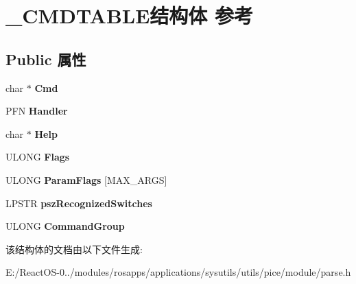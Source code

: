 \hypertarget{struct___c_m_d_t_a_b_l_e}{}\section{\+\_\+\+C\+M\+D\+T\+A\+B\+L\+E结构体 参考}
\label{struct___c_m_d_t_a_b_l_e}
\subsection*{Public 属性}
\begin{DoxyCompactItemize}
\item 
\mbox{\label{struct___c_m_d_t_a_b_l_e_a99bcf8adc7c69098dff6dbfadb519743}} 
char $\ast$ {\bfseries Cmd}
\item 
\mbox{\label{struct___c_m_d_t_a_b_l_e_a22b9b47e65cace28fbd5368da2175c80}} 
P\+FN {\bfseries Handler}
\item 
\mbox{\label{struct___c_m_d_t_a_b_l_e_ad5e4a498ee7e446883694b4175ee2f1a}} 
char $\ast$ {\bfseries Help}
\item 
\mbox{\label{struct___c_m_d_t_a_b_l_e_aa71f8c943e1ae5283ea1e626ca776016}} 
U\+L\+O\+NG {\bfseries Flags}
\item 
\mbox{\label{struct___c_m_d_t_a_b_l_e_a42f98899672c4bfb21ad17b1539307d0}} 
U\+L\+O\+NG {\bfseries Param\+Flags} \mbox{[}M\+A\+X\+\_\+\+A\+R\+GS\mbox{]}
\item 
\mbox{\label{struct___c_m_d_t_a_b_l_e_ac7673d8b0c14a5c0d7c6fbaa1b0e7a5c}} 
L\+P\+S\+TR {\bfseries psz\+Recognized\+Switches}
\item 
\mbox{\label{struct___c_m_d_t_a_b_l_e_ab8d0bb07e3bbf209481646668127a299}} 
U\+L\+O\+NG {\bfseries Command\+Group}
\end{DoxyCompactItemize}


该结构体的文档由以下文件生成\+:\begin{DoxyCompactItemize}
\item 
E\+:/\+React\+O\+S-\/0../modules/rosapps/applications/sysutils/utils/pice/module/parse.\+h\end{DoxyCompactItemize}
